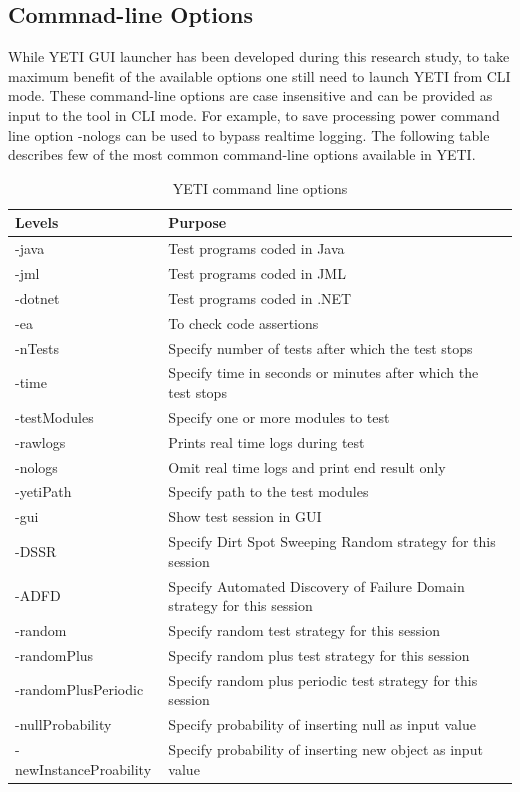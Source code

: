 \subsection{Commnad-line Options}
While YETI GUI launcher has been developed during this research study, to take maximum benefit of the available options one still need to launch YETI from CLI mode. These command-line options are case insensitive and can be provided as input to the tool in CLI mode. For example, to save processing power command line option -nologs can be used to bypass realtime logging. The following table describes few of the most common command-line options available in YETI.    

\begin{table}[h]
\caption{YETI command line options} %
\smallskip
\centering %
\begin{tabular}{ll } %
\hline

Levels 					&Purpose 			\\
\hline
-java						&Test programs coded in Java	 	\\
-jml						&Test programs coded in JML			\\
-dotnet					&Test programs coded in .NET		\\
-ea						&To check code assertions \\
-nTests					&Specify number of tests after which the test stops	\\
-time						&Specify time in seconds or minutes after which the test stops\\
-testModules				&Specify one or more modules to test 	\\
-rawlogs					&Prints real time logs during test \\
-nologs					&Omit real time logs and print end result only\\
-yetiPath					&Specify path to the test modules\\ 
-gui						&Show test session in GUI\\
-DSSR					&Specify Dirt Spot Sweeping Random strategy for this session\\
-ADFD					&Specify Automated Discovery of Failure Domain strategy for this session\\
-random					&Specify random test strategy for this session\\
-randomPlus				&Specify random plus test strategy for this session\\
-randomPlusPeriodic		&Specify random plus periodic test strategy for this session\\
-nullProbability				&Specify probability of inserting null as input value\\
-newInstanceProability		&Specify probability of inserting new object as input value\\

\hline %
\end{tabular}
\bigskip
\label{table:cliOptions} %
\end{table}


